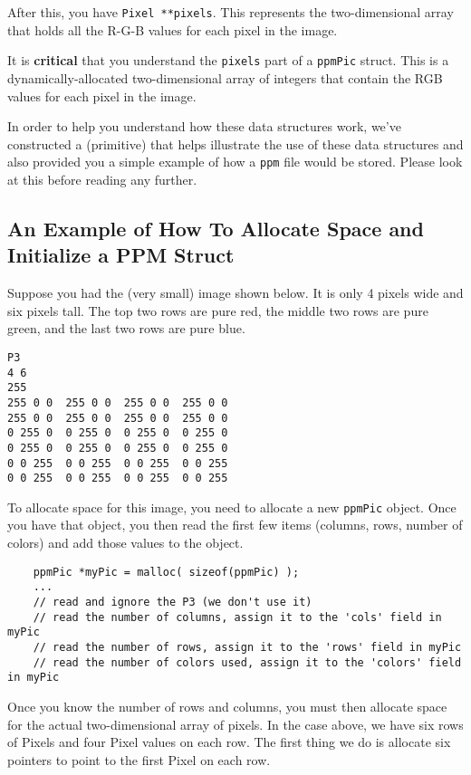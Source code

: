 \documentclass[12pt]{article}
\begin{document}
After this, you have {\tt Pixel **pixels}.  This represents the two-dimensional
array that holds all the R-G-B values for each pixel in the image.

It is {\bf critical} that you understand the {\tt pixels} part of a
{\tt ppmPic} struct.  This is a dynamically-allocated two-dimensional
array of integers that contain the RGB values for each pixel in the image.

In order to help you understand how these data structures work, we've
constructed a (primitive) 
that helps illustrate the use of these
data structures and also provided you a simple example of how a {\tt ppm} file
would be stored.  Please look at this
before reading any further.

\subsection*{An Example of How To Allocate Space and Initialize a PPM Struct}

Suppose you had the (very small) image shown below.  It is only 4 pixels wide
and six pixels tall. The top two rows are pure red, the middle two rows
are pure green, and the last two rows are pure blue.

\begin{verbatim}
P3
4 6
255
255 0 0  255 0 0  255 0 0  255 0 0
255 0 0  255 0 0  255 0 0  255 0 0
0 255 0  0 255 0  0 255 0  0 255 0 
0 255 0  0 255 0  0 255 0  0 255 0 
0 0 255  0 0 255  0 0 255  0 0 255
0 0 255  0 0 255  0 0 255  0 0 255
\end{verbatim}

To allocate space for this image, you need to allocate a new
{\tt ppmPic} object.  Once you have that object, you then read
the first few items (columns, rows, number of colors) and add
those values to the object.

\begin{verbatim}
    ppmPic *myPic = malloc( sizeof(ppmPic) );
    ...
    // read and ignore the P3 (we don't use it)
    // read the number of columns, assign it to the 'cols' field in myPic
    // read the number of rows, assign it to the 'rows' field in myPic
    // read the number of colors used, assign it to the 'colors' field in myPic
\end{verbatim}

Once you know the number of rows
and columns, you must then allocate space for the actual two-dimensional
array of pixels.  In the case above, we have six rows of Pixels and
four Pixel values on each row.  The first thing we do is allocate six
pointers to point to the first Pixel on each row.
\end{document}
